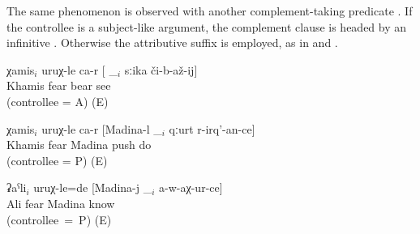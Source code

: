 The same phenomenon is observed with another complement-taking predicate  . If the controllee is a subject-like argument, the complement clause is headed by an infinitive . Otherwise the attributive suffix  is employed, as in  and .
%
\begin{exe}
	\ex	\label{ex:Khamis, bears, Madina, Ali@46}
	\begin{xlist}
		\ex	\label{ex:Khamis fears to see the bear@46a}
		\gll	χamis$_{i}$	uruχ-le ca-r	[ \_$_{i}$	sːika	či-b-až-ij]\\
			Khamis	fear 	{} 	bear	see\\
		\glt	{} (controllee = A) (E)

		\ex	\label{ex:Khamis fears that Madina pushes her@46b}
		\gll	χamis$_{i}$	uruχ-le ca-r	[Madina-l	\_$_{i}$	qːurt	r-irq'-an-ce]\\
			Khamis	fear 	Madina		push	do\\
		\glt	{} (controllee = P) (E)

		\ex	\label{ex:Ali feared that Madina would not recognize / know him@46c}
		\gll	ʡaˁli$_{i}$	uruχ-le=de	[Madina-j	\_$_{i}$	a-w-aχ-ur-ce]\\
			Ali	fear	Madina		know\\
		\glt	{}  (controllee~=~P) (E)
	\end{xlist}
\end{exe}

